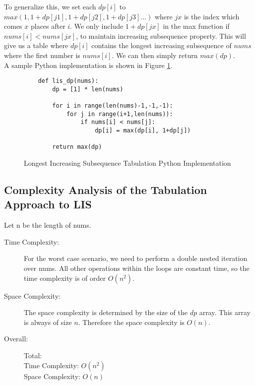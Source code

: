 To generalize this, we set each $dp[i]$ to $max(1,1+dp[j1],1+dp[j2],1+dp[j3]...)$ where $jx$ is the index which comes $x$ places after $i$.
We only include $1+dp[jx]$ in the max function if $nums[i] < nums[jx]$, to maintain increasing subsequence property.
This will give us a table where $dp[i]$ contains the longest increasing subsequence of $nums$ where the first number is $nums[i]$.
We can then simply return $max(dp)$.\\

A sample Python implementation is shown in Figure \ref{fig:lis-dp}.

\begin{figure}[H]
    \centering
    \begin{lstlisting}
    def lis_dp(nums):
        dp = [1] * len(nums)
    
        for i in range(len(nums)-1,-1,-1):
            for j in range(i+1,len(nums)):
                if nums[i] < nums[j]:
                    dp[i] = max(dp[i], 1+dp[j])
    
        return max(dp)
    \end{lstlisting}
    \caption{Longest Increasing Subsequence Tabulation Python Implementation}
    \label{fig:lis-dp}
\end{figure}

\subsection{Complexity Analysis of the Tabulation Approach to LIS}
Let n be the length of nums.
\begin{description}
    \item[Time Complexity:]
        For the worst case scenario, we need to perform a double nested iteration over nums.
        All other operations within the loops are constant time, so the time complexity is of order $O(n^2)$.
        
    \item[Space Complexity:] 
        The space complexity is determined by the size of the $dp$ array. This array is always of size $n$.
        Therefore the space complexity is $O(n)$.
        
        
    \item[Overall:] Total:\\
        Time Complexity: $O(n^2)$\\
        Space Complexity: $O(n)$
    
\end{description}
